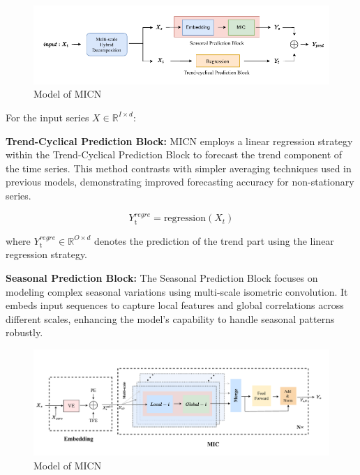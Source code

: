 \documentclass{ieeeojies}
\begin{document}
\begin{figure}[H]
  \centering
  \begin{minipage}{1\linewidth}
    \centering
    \includegraphics[width=\linewidth]{bibliography/micn_fig.png}
    \caption{Model of MICN}
    \label{fig11}
  \end{minipage}
\end{figure}

For the input series \( X \in \mathbb{R}^{I \times d} \):

\textbf{Trend-Cyclical Prediction Block:} MICN employs a linear regression strategy within the Trend-Cyclical Prediction Block to forecast the trend component of the time series. This method contrasts with simpler averaging techniques used in previous models, demonstrating improved forecasting accuracy for non-stationary series.

\[ Y_{\text{t}}^{regre} = \text{regression}(X_t) \]

where \( Y_{\text{t}}^{regre} \in \mathbb{R}^{O \times d} \) denotes the prediction of the trend part using the linear regression strategy.

\textbf{Seasonal Prediction Block:} The Seasonal Prediction Block focuses on modeling complex seasonal variations using multi-scale isometric convolution. It embeds input sequences to capture local features and global correlations across different scales, enhancing the model's capability to handle seasonal patterns robustly.

\begin{figure}[H]
  \centering
  \begin{minipage}{1\linewidth}
    \centering
    \includegraphics[width=\linewidth]{bibliography/micn_fig2.png}
    \caption{Model of MICN}
    \label{fig11}
  \end{minipage}
\end{figure}
\end{document}
